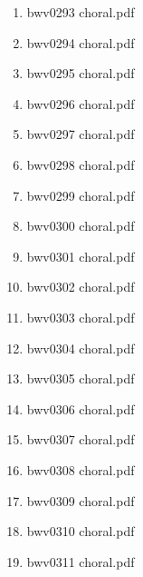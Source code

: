 \documentclass[11pt]{article}
\begin{document}
\begin{enumerate}
\begin{enumerate}
\begin{enumerate}
\begin{enumerate}
\item bwv0293 choral.pdf
\label{sec-1-1-1-1-44-6-7-2-4-42}

\item bwv0294 choral.pdf
\label{sec-1-1-1-1-44-6-7-2-4-43}

\item bwv0295 choral.pdf
\label{sec-1-1-1-1-44-6-7-2-4-44}

\item bwv0296 choral.pdf
\label{sec-1-1-1-1-44-6-7-2-4-45}

\item bwv0297 choral.pdf
\label{sec-1-1-1-1-44-6-7-2-4-46}

\item bwv0298 choral.pdf
\label{sec-1-1-1-1-44-6-7-2-4-47}

\item bwv0299 choral.pdf
\label{sec-1-1-1-1-44-6-7-2-4-48}

\item bwv0300 choral.pdf
\label{sec-1-1-1-1-44-6-7-2-4-49}

\item bwv0301 choral.pdf
\label{sec-1-1-1-1-44-6-7-2-4-50}

\item bwv0302 choral.pdf
\label{sec-1-1-1-1-44-6-7-2-4-51}

\item bwv0303 choral.pdf
\label{sec-1-1-1-1-44-6-7-2-4-52}

\item bwv0304 choral.pdf
\label{sec-1-1-1-1-44-6-7-2-4-53}

\item bwv0305 choral.pdf
\label{sec-1-1-1-1-44-6-7-2-4-54}

\item bwv0306 choral.pdf
\label{sec-1-1-1-1-44-6-7-2-4-55}

\item bwv0307 choral.pdf
\label{sec-1-1-1-1-44-6-7-2-4-56}

\item bwv0308 choral.pdf
\label{sec-1-1-1-1-44-6-7-2-4-57}

\item bwv0309 choral.pdf
\label{sec-1-1-1-1-44-6-7-2-4-58}

\item bwv0310 choral.pdf
\label{sec-1-1-1-1-44-6-7-2-4-59}

\item bwv0311 choral.pdf
\label{sec-1-1-1-1-44-6-7-2-4-60}


\end{enumerate}
\end{enumerate}
\end{enumerate}
\end{enumerate}
\end{document}
